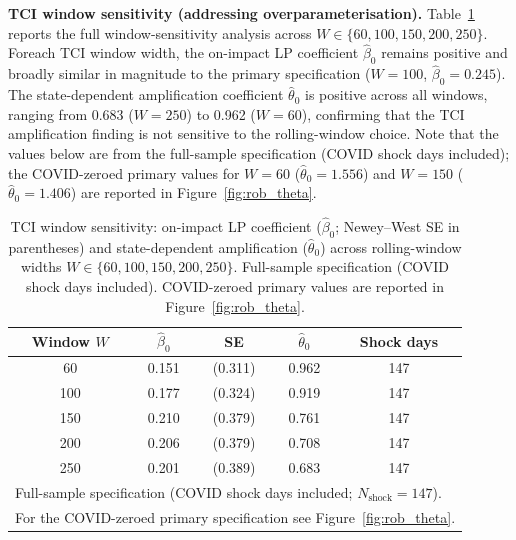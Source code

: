 \documentclass[11pt]{article}
\begin{document}
\bigskip

\noindent\textbf{TCI window sensitivity (addressing overparameterisation).}
Table~\ref{tab:tci_window_sensitivity} reports the full window-sensitivity analysis
across $W \in \{60, 100, 150, 200, 250\}$.
Foreach TCI window width, the on-impact LP coefficient $\hat\beta_0$ remains positive and broadly similar in magnitude to the primary specification ($W=100$, $\hat\beta_0 = 0.245$). The state-dependent amplification coefficient $\hat\theta_0$ is positive across all windows, ranging from 0.683 ($W=250$) to 0.962 ($W=60$), confirming that the TCI amplification finding is not sensitive to the rolling-window choice. Note that the values below are from the full-sample specification (COVID shock days included); the COVID-zeroed primary values for $W=60$ ($\hat\theta_0=1.556$) and $W=150$ ($\hat\theta_0=1.406$) are reported in Figure~\ref{fig:rob_theta}.

\begin{table}[ht]
\centering
\small
\caption{TCI window sensitivity: on-impact LP coefficient ($\hat\beta_0$; Newey--West SE in parentheses)
and state-dependent amplification ($\hat\theta_0$) across rolling-window widths $W \in \{60,100,150,200,250\}$.
Full-sample specification (COVID shock days included). COVID-zeroed primary values are reported in Figure~\ref{fig:rob_theta}.}
\label{tab:tci_window_sensitivity}
\begin{tabular}{ccccc}
\hline\hline
Window $W$ & $\hat\beta_0$ & SE & $\hat\theta_0$ & Shock days \\
\hline
60  & 0.151 & (0.311) & 0.962 & 147 \\
100 & 0.177 & (0.324) & 0.919 & 147 \\
150 & 0.210 & (0.379) & 0.761 & 147 \\
200 & 0.206 & (0.379) & 0.708 & 147 \\
250 & 0.201 & (0.389) & 0.683 & 147 \\
\hline\hline
\multicolumn{5}{l}{\footnotesize Full-sample specification (COVID shock days included; $N_{\text{shock}}=147$).} \\
\multicolumn{5}{l}{\footnotesize For the COVID-zeroed primary specification see Figure~\ref{fig:rob_theta}.}
\end{tabular}
\end{table}



\end{document}
